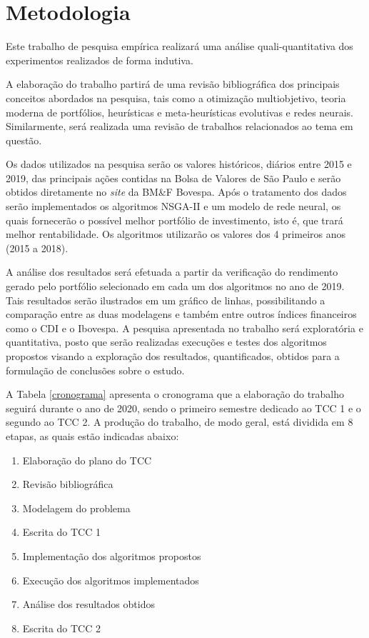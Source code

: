 \documentclass[11pt]{article}
\begin{document}
\section{Metodologia}
\label{met}

    Este trabalho de pesquisa empírica realizará uma análise quali-quantitativa dos experimentos realizados de forma indutiva.

    A elaboração do trabalho partirá de uma revisão bibliográfica dos principais conceitos abordados na pesquisa, tais como a otimização multiobjetivo, teoria moderna de portfólios, heurísticas e meta-heurísticas evolutivas e redes neurais. Similarmente, será realizada uma revisão de trabalhos relacionados ao tema em questão.
    
    Os dados utilizados na pesquisa serão os valores históricos, diários entre 2015 e 2019, das principais ações contidas na Bolsa de Valores de São Paulo e serão obtidos diretamente no \textit{site} da BM\&F Bovespa. Após o tratamento dos dados serão implementados os algoritmos NSGA-II e um modelo de rede neural, os quais fornecerão o possível melhor portfólio de investimento, isto é, que trará melhor rentabilidade. Os algoritmos utilizarão os valores dos 4 primeiros anos (2015 a 2018).
    
    A análise dos resultados será efetuada a partir da verificação do rendimento gerado pelo portfólio selecionado em cada um dos algoritmos no ano de 2019. Tais resultados serão ilustrados em um gráfico de linhas, possibilitando a comparação entre as duas modelagens e também entre outros índices financeiros como o CDI e o Ibovespa. A pesquisa apresentada no trabalho será exploratória e quantitativa, posto que serão realizadas execuções e testes dos algoritmos propostos visando a exploração dos resultados, quantificados, obtidos para a formulação de conclusões sobre o estudo.


    A Tabela \ref{cronograma} apresenta o cronograma que a elaboração do trabalho seguirá durante o ano de 2020, sendo o primeiro semestre dedicado ao TCC 1 e o segundo ao TCC 2. A produção do trabalho, de modo geral, está dividida em 8 etapas, as quais estão indicadas abaixo:

    \begin{enumerate}
    	\item Elaboração do plano do TCC 
    	\item Revisão bibliográfica
    	\item Modelagem do problema
    	\item Escrita do TCC 1
    	\item Implementação dos algoritmos propostos
    	\item Execução dos algoritmos implementados
    	\item Análise dos resultados obtidos
    	\item Escrita do TCC 2
    \end{enumerate}
\end{document}
